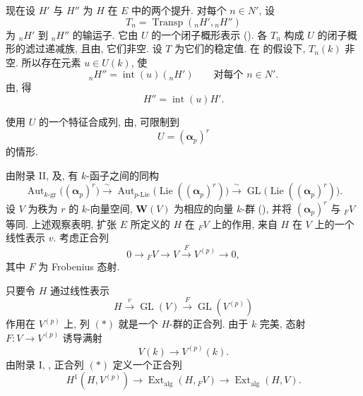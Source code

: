 现在设 \(H'\) 与 \(H''\) 为 \(H\) 在 \(E\) 中的两个提升.
对每个 \(n\in N'\), 设
\[
  T_n=\operatorname{Transp}({}_nH',{}_nH'')
\]
为 \({}_nH'\) 到 \({}_nH''\) 的输运子.
它由 \(U\) 的一个闭子概形表示
().
各 \(T_n\) 构成 \(U\) 的闭子概形的滤过递减族,
且由, 它们非空.
设 \(T\) 为它们的稳定值. 在 的假设下,
\(T_n(k)\) 非空. 所以存在元素 \(u\in U(k)\), 使
\[
  {}_nH''=\operatorname{int}(u)({}_nH')
  \qquad\text{对每个 \(n\in N'\)}.
\]
由, 得
\[
  H''=\operatorname{int}(u)H'.
\]



使用 \(U\) 的一个特征合成列, 由, 可限制到
\[
  U=(\boldsymbol\alpha_p)^r
\]
的情形.

由附录 II,  及,
有 \(k\)-函子之间的同构
\[
  \operatorname{Aut}_{k\text{-}\mathrm{gr}}
    \bigl((\boldsymbol\alpha_p)^r\bigr)
  \xrightarrow{\ \sim\ }
  \operatorname{Aut}_{p\text{-}\mathrm{Lie}}
    \bigl(\operatorname{Lie}((\boldsymbol\alpha_p)^r)\bigr)
  \xrightarrow{\ \sim\ }
  \operatorname{GL}
    \bigl(\operatorname{Lie}((\boldsymbol\alpha_p)^r)\bigr).
\]
设 \(V\) 为秩为 \(r\) 的 \(k\)-向量空间,
\(\mathbf W(V)\) 为相应的向量 \(k\)-群 (),
并将 \((\boldsymbol\alpha_p)^r\) 与 \({}_F V\) 等同.
上述观察表明, 扩张 \(E\) 所定义的 \(H\) 在 \({}_F V\) 上的作用,
来自 \(H\) 在 \(V\) 上的一个线性表示 \(v\).
考虑正合列
\[
  \tag{*}\label{sga3:xvii:proposition:5-4-1:equation:star}
  0\longrightarrow {}_F V\longrightarrow V
    \xrightarrow{F}V^{(p)}\longrightarrow0,
\]
其中 \(F\) 为 Frobenius 态射.

只要令 \(H\) 通过线性表示
\[
  H\xrightarrow{v}\operatorname{GL}(V)
    \xrightarrow{F}\operatorname{GL}(V^{(p)})
\]
作用在 \(V^{(p)}\) 上, 列 \((*)\) 就是一个 \(H\)-群的正合列.
由于 \(k\) 完美, 态射 \(F:V\to V^{(p)}\) 诱导满射
\[
  V(k)\longrightarrow V^{(p)}(k).
\]
由附录 I, , 正合列 \((*)\) 定义一个正合列
\[
  \tag{**}\label{sga3:xvii:proposition:5-4-1:equation:double-star}
  H^1(H,V^{(p)})\longrightarrow
  \operatorname{Ext}_{\mathrm{alg}}(H,{}_F V)
  \longrightarrow
  \operatorname{Ext}_{\mathrm{alg}}(H,V).
\]

